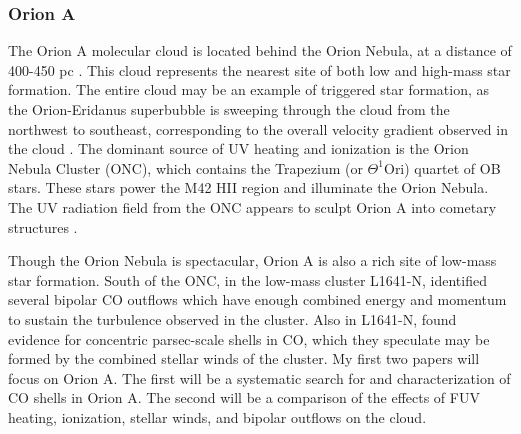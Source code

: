 \subsubsection{Orion A}\label{sec:orion}
The Orion A molecular cloud is located behind the Orion Nebula, at a distance of 400-450 pc \cite{Menten07}. This cloud represents the nearest site of both low and high-mass star formation. The entire cloud may be an example of triggered star formation, as the Orion-Eridanus superbubble is sweeping through the cloud from the northwest to southeast, corresponding to the overall velocity gradient observed in the cloud \cite{Bally08}. The dominant source of UV heating and ionization is the Orion Nebula Cluster (ONC), which contains the Trapezium (or $\Theta^1$Ori) quartet of OB stars. These stars power the M42 HII region and illuminate the Orion Nebula. The UV radiation field from the ONC appears to sculpt Orion A into cometary structures \cite{Bally08}.

Though the Orion Nebula is spectacular, Orion A is also a rich site of low-mass star formation. South of the ONC, in the low-mass cluster L1641-N, \citet{Stanke_2007} identified several bipolar CO outflows which have enough combined energy and momentum to sustain the turbulence observed in the cluster. Also in L1641-N, \citet{Nakamura_2012} found evidence for concentric parsec-scale shells in CO, which they speculate may be formed by the combined stellar winds of the cluster. My first two papers will focus on Orion A. The first will be a systematic search for and characterization of CO shells in Orion A. The second will be a comparison of the effects of FUV heating, ionization, stellar winds, and bipolar outflows on the  cloud.